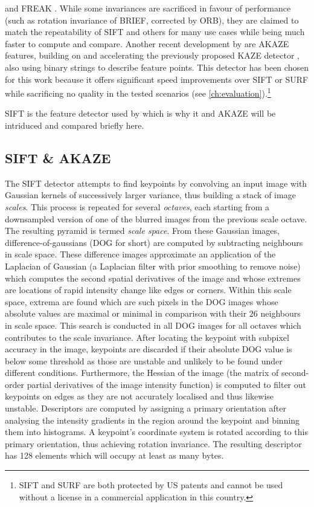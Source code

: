 \citep[Oriented BRIEF]{rublee2011} and FREAK \citep[Fast Retina
Keypoint]{ortiz2012}. While some invariances are sacrificed in favour of
performance (such as rotation invariance of BRIEF, corrected by ORB), they are
claimed to match the repeatability of SIFT and others for many use cases while
being much faster to compute and compare. Another recent development by
\citet{alcantarilla2013} are AKAZE features, building on and accelerating the
previously proposed KAZE detector \citep{alcantarilla2012}, also using binary
strings to describe feature points. This detector has been chosen for this work
because it offers significant speed improvements over SIFT or SURF while sacrificing
no quality in the tested scenarios (see \autoref{ch:evaluation}).\footnote{SIFT
and SURF are both protected by US patents and cannot be used without a license
in a commercial application in this country.}

SIFT is the feature detector used by \citet{bae2010} which is why it and AKAZE
will be intriduced and compared briefly here.

\subsection{SIFT \& AKAZE}\label{subsec:sift_akaze}

The SIFT detector attempts to find keypoints by convolving an input image with
Gaussian kernels of successively larger variance, thus building a stack of image
\emph{scales}. This process is repeated for several \emph{octaves}, each
starting from a downsampled version of one of the blurred images from the
previous scale octave. The resulting pyramid is termed \emph{scale space}.  From
these Gaussian images, difference-of-gaussians (DOG for short) are computed by
subtracting neighbours in scale space. These difference images approximate an
application of the Laplacian of Gaussian (a Laplacian filter with prior
smoothing to remove noise) which computes the second spatial derivatives of the
image and whose extremes are locations of rapid intensity change like edges or
corners. Within this scale space, extrema are found which are such pixels in the
DOG images whose absolute values are maximal or minimal in comparison with their
$26$ neighbours in scale space. This search is conducted in all DOG images
for all octaves which contributes to the scale invariance. After locating the
keypoint with subpixel accuracy in the image, keypoints are discarded if their
absolute DOG value is below some threshold as those are unstable and unlikely to
be found under different conditions. Furthermore, the Hessian of the image (the
matrix of second-order partial derivatives of the image intensity function) is
computed to filter out keypoints on edges as they are not accurately localised
and thus likewise unstable. Descriptors are computed by assigning a primary
orientation after analysing the intensity gradients in the region around the
keypoint and binning them into histograms. A keypoint's coordinate system is
rotated according to this primary orientation, thus achieving rotation
invariance. The resulting descriptor has 128 elements which will occupy at least
as many bytes.


